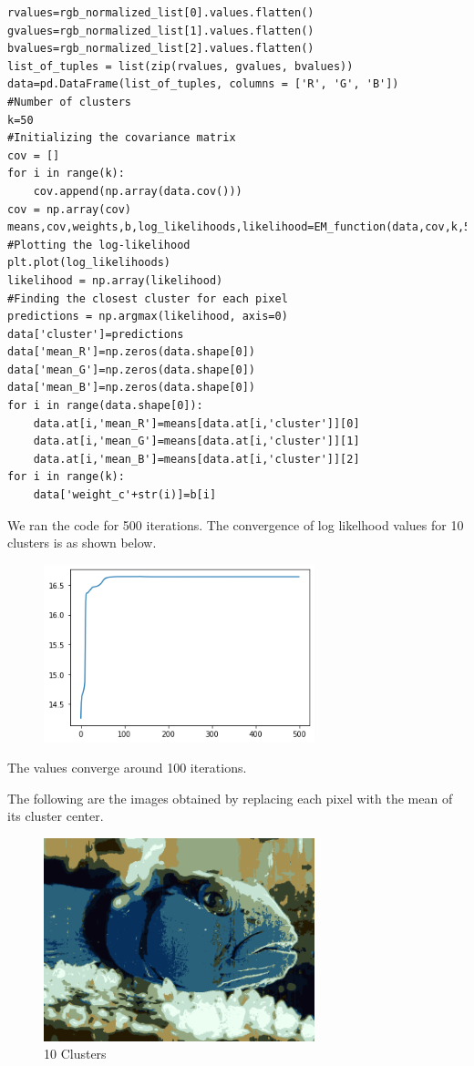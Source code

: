 \documentclass{article}      %
\begin{document}
\begin{lstlisting}
rvalues=rgb_normalized_list[0].values.flatten()
gvalues=rgb_normalized_list[1].values.flatten()
bvalues=rgb_normalized_list[2].values.flatten()
list_of_tuples = list(zip(rvalues, gvalues, bvalues))  
data=pd.DataFrame(list_of_tuples, columns = ['R', 'G', 'B'])
#Number of clusters
k=50
#Initializing the covariance matrix
cov = []
for i in range(k):
    cov.append(np.array(data.cov()))
cov = np.array(cov)
means,cov,weights,b,log_likelihoods,likelihood=EM_function(data,cov,k,500)
#Plotting the log-likelihood
plt.plot(log_likelihoods)
likelihood = np.array(likelihood)
#Finding the closest cluster for each pixel
predictions = np.argmax(likelihood, axis=0)
data['cluster']=predictions
data['mean_R']=np.zeros(data.shape[0])
data['mean_G']=np.zeros(data.shape[0])
data['mean_B']=np.zeros(data.shape[0])
for i in range(data.shape[0]):
    data.at[i,'mean_R']=means[data.at[i,'cluster']][0]
    data.at[i,'mean_G']=means[data.at[i,'cluster']][1]
    data.at[i,'mean_B']=means[data.at[i,'cluster']][2]
for i in range(k):
    data['weight_c'+str(i)]=b[i]
\end{lstlisting}

 We ran the code for 500 iterations. The convergence of log likelhood values for 10 clusters is as shown below. 

\begin{figure}[H]
\centering
\includegraphics[width=0.7\textwidth]{Convergence_partd_10}
\end{figure}

The values converge around 100 iterations.

The following are the images obtained by replacing each pixel with the mean of its cluster center. 

\begin{figure}[H]
\centering
\includegraphics[width=0.7\textwidth]{partd_10_means}
\caption{10 Clusters}
\end{figure}
\end{document}
